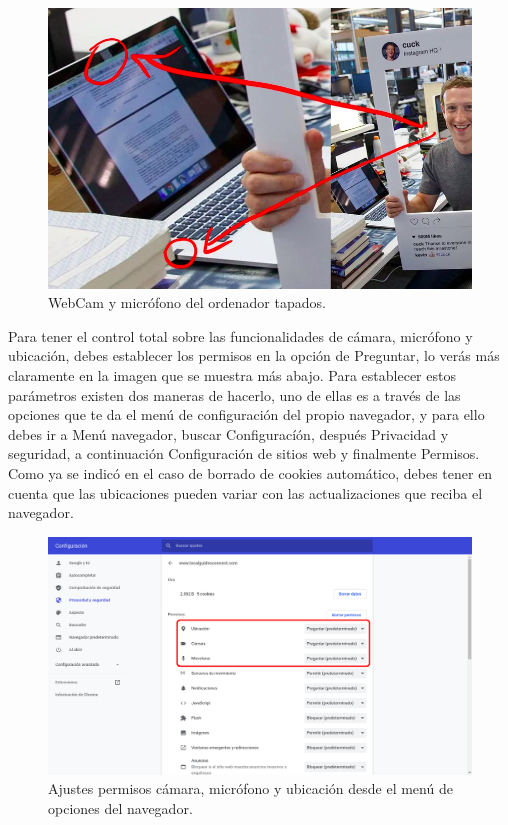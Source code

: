 \documentclass[
  spanish,
  a4paper,
  openany]{book}
\begin{document}
\begin{figure}

{\centering \includegraphics[width=0.75\linewidth]{images/webca-mark-zuckerberg} 

}

\caption{WebCam y micrófono del ordenador tapados.}\label{fig:unnamed-chunk-6}
\end{figure}

Para tener el control total sobre las funcionalidades de cámara, micrófono y ubicación, debes establecer los permisos en la opción de Preguntar, lo verás más claramente en la imagen que se muestra más abajo. Para establecer estos parámetros existen dos maneras de hacerlo, uno de ellas es a través de las opciones que te da el menú de configuración del propio navegador, y para ello debes ir a Menú navegador, buscar Configuracíón, después Privacidad y seguridad, a continuación Configuración de sitios web y finalmente Permisos. Como ya se indicó en el caso de borrado de cookies automático, debes tener en cuenta que las ubicaciones pueden variar con las actualizaciones que reciba el navegador.

\begin{figure}

{\centering \includegraphics[width=0.75\linewidth]{images/ajuste-permisos} 

}

\caption{Ajustes permisos cámara, micrófono y ubicación desde el menú de opciones del navegador.}\label{fig:unnamed-chunk-7}
\end{figure}
\end{document}
